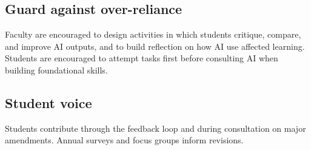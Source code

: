 \subsection{Guard against over-reliance}
Faculty are encouraged to design activities in which students critique, compare, and improve AI outputs, and to build reflection on how AI use affected learning. Students are encouraged to attempt tasks first before consulting AI when building foundational skills.

\subsection{Student voice}
Students contribute through the feedback loop and during consultation on major amendments. Annual surveys and focus groups inform revisions.

